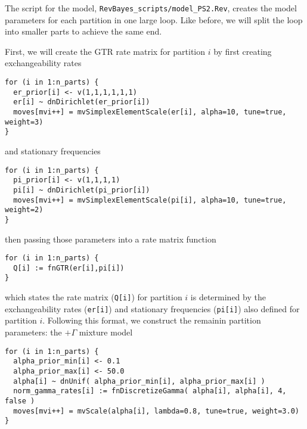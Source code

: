 The script for the model, {\tt RevBayes\_scripts/model\_PS2.Rev}, creates the model parameters for each partition in one large loop.
Like before, we will split the loop into smaller parts to achieve the same end.

First, we will create the GTR rate matrix for partition $i$ by first creating exchangeability rates
{\tt \small \begin{snugshade*}
\begin{lstlisting}
for (i in 1:n_parts) {
  er_prior[i] <- v(1,1,1,1,1,1)
  er[i] ~ dnDirichlet(er_prior[i])
  moves[mvi++] = mvSimplexElementScale(er[i], alpha=10, tune=true, weight=3) 
}
\end{lstlisting}
\end{snugshade*}}

and stationary frequencies

{\tt \small \begin{snugshade*}
\begin{lstlisting}
for (i in 1:n_parts) {
  pi_prior[i] <- v(1,1,1,1)
  pi[i] ~ dnDirichlet(pi_prior[i])
  moves[mvi++] = mvSimplexElementScale(pi[i], alpha=10, tune=true, weight=2)
}
\end{lstlisting}
\end{snugshade*}}

then passing those parameters into a rate matrix function

{\tt \small \begin{snugshade*}
\begin{lstlisting}
for (i in 1:n_parts) {
  Q[i] := fnGTR(er[i],pi[i]) 
}
\end{lstlisting}
\end{snugshade*}}

which states the rate matrix ({\tt Q[i]}) for partition $i$ is determined by the exchangeability rates ({\tt er[i]}) and stationary frequencies ({\tt pi[i]}) also defined for partition $i$.
Following this format, we construct the remainin partition parameters: the $+\Gamma$ mixture model

{\tt \small \begin{snugshade*}
\begin{lstlisting}
for (i in 1:n_parts) {
  alpha_prior_min[i] <- 0.1
  alpha_prior_max[i] <- 50.0
  alpha[i] ~ dnUnif( alpha_prior_min[i], alpha_prior_max[i] )
  norm_gamma_rates[i] := fnDiscretizeGamma( alpha[i], alpha[i], 4, false )
  moves[mvi++] = mvScale(alpha[i], lambda=0.8, tune=true, weight=3.0)
}
\end{lstlisting}
\end{snugshade*}}

